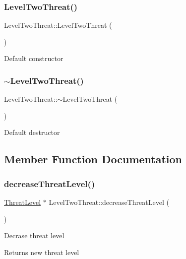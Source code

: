 \subsubsection{\texorpdfstring{Level\+Two\+Threat()}{LevelTwoThreat()}}
{\footnotesize\ttfamily Level\+Two\+Threat\+::\+Level\+Two\+Threat (\begin{DoxyParamCaption}{ }\end{DoxyParamCaption})}

Default constructor \mbox{\label{classLevelTwoThreat_af07b8e6bfd18b564a83c41cae1ffb37a}} 
\subsubsection{\texorpdfstring{$\sim$\+Level\+Two\+Threat()}{~LevelTwoThreat()}}
{\footnotesize\ttfamily Level\+Two\+Threat\+::$\sim$\+Level\+Two\+Threat (\begin{DoxyParamCaption}{ }\end{DoxyParamCaption})}

Default destructor 

\subsection{Member Function Documentation}
\mbox{\label{classLevelTwoThreat_a1d9e88b0f43396721a2f51ae67191359}} 
\subsubsection{\texorpdfstring{decrease\+Threat\+Level()}{decreaseThreatLevel()}}
{\footnotesize\ttfamily \hyperlink{classThreatLevel}{Threat\+Level} $\ast$ Level\+Two\+Threat\+::decrease\+Threat\+Level (\begin{DoxyParamCaption}{ }\end{DoxyParamCaption})\hspace{0.3cm}{\ttfamily [virtual]}}

Decrase threat level \begin{DoxyReturn}{Returns}
new threat level 
\end{DoxyReturn}


